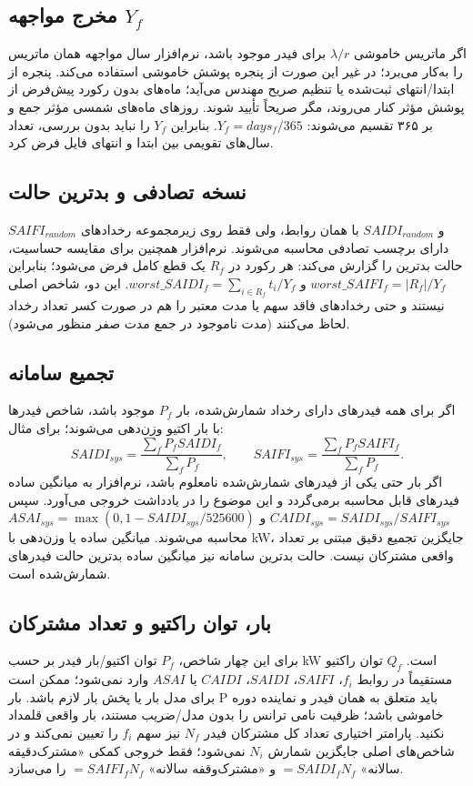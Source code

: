 \documentclass[11pt,a4paper,oneside]{book}
\begin{document}
\subsection*{مخرج مواجهه $Y_f$}
اگر ماتریس خاموشی $\lambda/r$ برای فیدر موجود باشد، نرم‌افزار سال مواجهه همان ماتریس را به‌کار می‌برد؛ در غیر این صورت از پنجره پوشش خاموشی استفاده می‌کند. پنجره از ابتدا/انتهای ثبت‌شده یا تنظیم صریح مهندس می‌آید؛ ماه‌های بدون رکورد پیش‌فرض از پوشش مؤثر کنار می‌روند، مگر صریحاً تأیید شوند. روزهای ماه‌های شمسی مؤثر جمع و بر ۳۶۵ تقسیم می‌شوند: $Y_f=days_f/365$. بنابراین $Y_f$ را نباید بدون بررسی، تعداد سال‌های تقویمی بین ابتدا و انتهای فایل فرض کرد.

\subsection*{نسخه تصادفی و بدترین حالت}
$SAIFI_{random}$ و $SAIDI_{random}$ با همان روابط، ولی فقط روی زیرمجموعه رخدادهای دارای برچسب تصادفی محاسبه می‌شوند. نرم‌افزار همچنین برای مقایسه حساسیت، حالت بدترین را گزارش می‌کند: هر رکورد در $R_f$ یک قطع کامل فرض می‌شود؛ بنابراین $worst\_SAIFI_f=|R_f|/Y_f$ و $worst\_SAIDI_f=\sum_{i\in R_f}t_i/Y_f$. این دو، شاخص اصلی نیستند و حتی رخدادهای فاقد سهم یا مدت معتبر را هم در صورت کسر تعداد رخداد لحاظ می‌کنند (مدت ناموجود در جمع مدت صفر منظور می‌شود).

\subsection*{تجمیع سامانه}
اگر برای همه فیدرهای دارای رخداد شمارش‌شده، بار $P_f$ موجود باشد، شاخص فیدرها با بار اکتیو وزن‌دهی می‌شوند؛ برای مثال:
\begin{equation}
 SAIDI_{sys}=\frac{\sum_f P_f SAIDI_f}{\sum_f P_f},\qquad
 SAIFI_{sys}=\frac{\sum_f P_f SAIFI_f}{\sum_f P_f}.
 \label{eq:system-load-weighted}
\end{equation}
اگر بار حتی یکی از فیدرهای شمارش‌شده نامعلوم باشد، نرم‌افزار به میانگین ساده فیدرهای قابل محاسبه برمی‌گردد و این موضوع را در یادداشت خروجی می‌آورد. سپس $CAIDI_{sys}=SAIDI_{sys}/SAIFI_{sys}$ و $ASAI_{sys}=\max(0,1-SAIDI_{sys}/525600)$ محاسبه می‌شوند. میانگین ساده یا وزن‌دهی با kW، جایگزین تجمیع دقیق مبتنی بر تعداد واقعی مشترکان نیست. حالت بدترین سامانه نیز میانگین ساده بدترین حالت فیدرهای شمارش‌شده است.

\subsection*{بار، توان راکتیو و تعداد مشترکان}
برای این چهار شاخص، $P_f$ توان اکتیو/بار فیدر بر حسب kW است. $Q_f$ توان راکتیو مستقیماً در روابط $f_i$، $SAIFI$، $SAIDI$، $CAIDI$ یا $ASAI$ وارد نمی‌شود؛ ممکن است برای مدل بار یا پخش بار لازم باشد. بار P باید متعلق به همان فیدر و نماینده دوره خاموشی باشد؛ ظرفیت نامی ترانس را بدون مدل/ضریب مستند، بار واقعی قلمداد نکنید. پارامتر اختیاری تعداد کل مشترکان فیدر $N_f$ نیز سهم $f_i$ را تعیین نمی‌کند و در شاخص‌های اصلی جایگزین شمارش $N_i$ نمی‌شود؛ فقط خروجی کمکی «مشترک‌دقیقه سالانه» $=SAIDI_fN_f$ و «مشترک‌وقفه سالانه» $=SAIFI_fN_f$ را می‌سازد.
\end{document}
